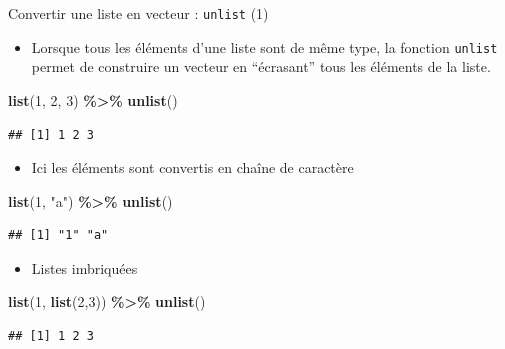 \documentclass[
  ignorenonframetext,
]{beamer}
\newenvironment{Shaded}{\begin{snugshade}}{\end{snugshade}}
\newcommand{\DecValTok}[1]{\textcolor[rgb]{0.00,0.00,0.81}{#1}}
\newcommand{\FunctionTok}[1]{\textcolor[rgb]{0.13,0.29,0.53}{\textbf{#1}}}
\newcommand{\NormalTok}[1]{#1}
\newcommand{\SpecialCharTok}[1]{\textcolor[rgb]{0.81,0.36,0.00}{\textbf{#1}}}
\newcommand{\StringTok}[1]{\textcolor[rgb]{0.31,0.60,0.02}{#1}}
\providecommand{\tightlist}{%
  \setlength{\itemsep}{0pt}\setlength{\parskip}{0pt}}
\begin{document}
\begin{frame}[fragile]{Convertir une liste en vecteur : \texttt{unlist}
(1)}
\protect\hypertarget{convertir-une-liste-en-vecteur-unlist-1}{}
\begin{itemize}
\tightlist
\item
  Lorsque tous les éléments d'une liste sont de même type, la fonction
  \texttt{unlist} permet de construire un vecteur en ``écrasant'' tous
  les éléments de la liste.
\end{itemize}

\tiny

\begin{Shaded}
\begin{Highlighting}[]
\FunctionTok{list}\NormalTok{(}\DecValTok{1}\NormalTok{, }\DecValTok{2}\NormalTok{, }\DecValTok{3}\NormalTok{) }\SpecialCharTok{\%\textgreater{}\%} \FunctionTok{unlist}\NormalTok{()}
\end{Highlighting}
\end{Shaded}

\begin{verbatim}
## [1] 1 2 3
\end{verbatim}

\normalsize

\begin{itemize}
\tightlist
\item
  Ici les éléments sont convertis en chaîne de caractère
\end{itemize}

\tiny

\begin{Shaded}
\begin{Highlighting}[]
\FunctionTok{list}\NormalTok{(}\DecValTok{1}\NormalTok{, }\StringTok{"a"}\NormalTok{) }\SpecialCharTok{\%\textgreater{}\%} \FunctionTok{unlist}\NormalTok{()}
\end{Highlighting}
\end{Shaded}

\begin{verbatim}
## [1] "1" "a"
\end{verbatim}

\normalsize

\begin{itemize}
\tightlist
\item
  Listes imbriquées
\end{itemize}

\tiny

\begin{Shaded}
\begin{Highlighting}[]
\FunctionTok{list}\NormalTok{(}\DecValTok{1}\NormalTok{, }\FunctionTok{list}\NormalTok{(}\DecValTok{2}\NormalTok{,}\DecValTok{3}\NormalTok{)) }\SpecialCharTok{\%\textgreater{}\%} \FunctionTok{unlist}\NormalTok{()}
\end{Highlighting}
\end{Shaded}

\begin{verbatim}
## [1] 1 2 3
\end{verbatim}

\normalsize
\end{frame}
\end{document}
